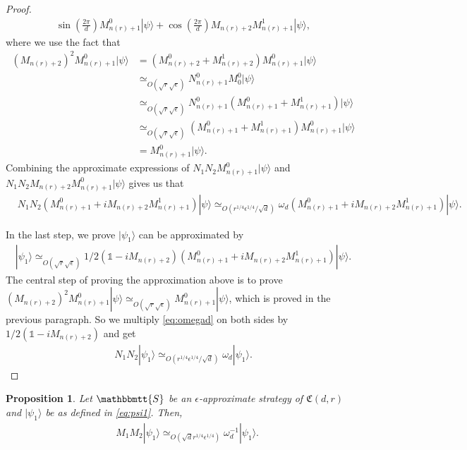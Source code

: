 \documentclass[11pt,letterpaper]{article}
\newcommand{\ket}[1]{|#1\rangle}
\newcommand{\1}{\mathbb{1}}
\newcommand{\nr}{n(r)}
\newcommand{\fC}{\mathfrak{C}}
\newcommand{\bS}{\mathbbmtt{S}}
\newcommand{\ep}{\epsilon}
\newcommand{\se}{\sqrt{\epsilon}}
\newcommand{\qe}{\epsilon^{1/4}}
\newcommand{\sd}{\sqrt{d}}
\newcommand{\sr}{\sqrt{r}}
\newcommand{\qr}{r^{1/4}}
\newcommand{\appd}[1]{\simeq_{#1}}
\newtheorem{proposition}[theorem]{Proposition}
\theoremstyle{definition}
\begin{document}
\begin{proof}
\begin{align*}
		\sin(\frac{2\pi}{d}) M_{\nr+1}^0\ket{\psi} + \cos(\frac{2\pi}{d})M_{\nr+2}M_{\nr+1}^1\ket{\psi},
        \end{align*}
        where we use the fact that 
        \begin{align*}
            (M_{\nr+2})^2 M_{\nr+1}^0 \ket{\psi} 
            &= (M_{\nr+2}^0 + M_{\nr+2}^1)M_{\nr+1}^0 \ket{\psi}\\
            &\appd{O(\sr \se)}N_{\nr+1}^0 M_0^0 \ket{\psi}\\
            &\appd{O(\sr \se)}N_{\nr+1}^0 (M_{\nr+1}^0+M_{\nr+1}^1)\ket{\psi} \\
            &\appd{O(\sr \se)}(M_{\nr+1}^0+M_{\nr+1}^1)M_{\nr+1}^0\ket{\psi} \\
            &= M_{\nr+1}^0 \ket{\psi}.
        \end{align*}
    Combining the approximate
    expressions of $N_1N_2M_{\nr+1}^0\ket{\psi}$
    and $N_1N_2 M_{\nr+2} M_{\nr+1}^0\ket{\psi}$ gives us that
	\begin{align}
		\label{eq:omegad}
		&N_1N_2 (M_{\nr+1}^0 + i M_{\nr+2}M_{\nr+1}^1) \ket{\psi} 
		\appd{O(\qr \qe/\sd)}\omega_d(M_{\nr+1}^0 + iM_{\nr+2}M_{\nr+1}^1) \ket{\psi}.
	\end{align}
	
	In the last step, we prove $\ket{\psi_1}$ can be 
	approximated by
	\begin{align*}
	\ket{\psi_1} \appd{O(\sr \se)} 1/2(\1 - iM_{\nr+2})(M_{\nr+1}^0 + i M_{\nr+2}M_{\nr+1}^1) \ket{\psi}.
	\end{align*}
	The central step of proving the approximation above is
	to prove $(M_{\nr+2})^2M_{\nr+1}^0 \ket{\psi} 
	\appd{O(\sr \se)} M_{\nr+1}^0 \ket{\psi}$,
	which is proved in the previous paragraph.
	So we multiply \cref{eq:omegad} on both sides by $1/2(\1 - iM_{\nr+2})$ and get
	\begin{align}
		N_1N_2 \ket{\psi_1} \appd{O(\qr \qe/\sd)} \omega_d\ket{\psi_1}.
	\end{align}
	
\end{proof}
\begin{proposition}
    \label{prop:psi1_eig2}
	Let $\bS$ be an $\ep$-approximate strategy of $\fC(d,r)$ and $\ket{\psi_1}$ be as defined in
	\cref{eq:psi1}.
	Then,
	\begin{align}
    \label{eq:psi1_eig2} 
    &M_1M_2 \ket{\psi_1} \appd{O(\sd\qr \qe)} \omega_d^{-1} \ket{\psi_1}.
	\end{align}
\end{proposition}
\end{document}

